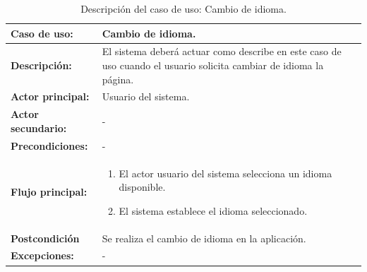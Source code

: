 \begin{table}[H]
  \begin{center}
    \begin{tabular}{|p{3.5cm}|p{10cm}|}
      \hline
      {\textbf{Caso de uso:}} & { Cambio de idioma.} \\
      \hline
      {\textbf{Descripción:}} & { El sistema deberá actuar como describe en este caso de uso cuando el usuario solicita cambiar de idioma la página.} \\
     \hline
      {\textbf{Actor principal:}} & { Usuario del sistema.} \\
      \hline
      {\textbf{Actor secundario:}} & { - } \\
      \hline
      {\textbf{Precondiciones:}} & { - } \\
     \hline   
    {\textbf{Flujo principal:}} & { 
      \begin{enumerate}
	\item El actor usuario del sistema selecciona un idioma disponible.
	\item El sistema establece el idioma seleccionado.
      \end{enumerate}
      } \\
     \hline
     {\textbf{Postcondición}} & {Se realiza el cambio de idioma en la aplicación.}\\
     \hline
         {\textbf{Excepciones:}} & { - }\\
     \hline
    \end{tabular}
  \end{center}
\caption{Descripción del caso de uso: Cambio de idioma.}
\end{table}





